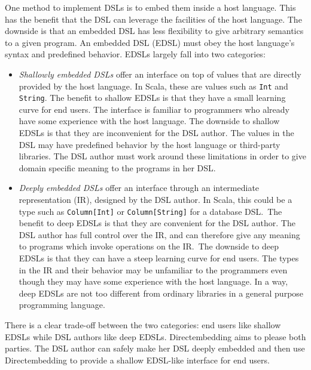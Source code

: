 \documentclass[11pt,a4paper]{article}
\begin{document}
One method to implement DSLs is to embed them inside a host language.
This has the benefit that the DSL can leverage the facilities of the host language.
The downside is that an embedded DSL has less flexibility to give arbitrary semantics to a given program.
An embedded DSL (EDSL) must obey the host language's syntax and predefined behavior.
EDSLs largely fall into two categories:
\begin{itemize}
    \item \emph{Shallowly embedded DSLs} offer an interface on top of values that are directly provided by the host language.
        In Scala, these are values such as \texttt{Int} and \texttt{String}.
        The benefit to shallow EDSLs is that they have a small learning curve for end users.
        The interface is familiar to programmers who already have some experience with the host language.
        The downside to shallow EDSLs is that they are inconvenient for the DSL author.
        The values in the DSL may have predefined behavior by the host language or third-party libraries.
        The DSL author must work around these limitations in order to give domain specific meaning to the programs in her DSL.

    \item \emph{Deeply embedded DSLs} offer an interface through an intermediate representation (IR), designed by the DSL author.
        In Scala, this could be a type such as \texttt{Column[Int]} or \texttt{Column[String]} for a database DSL.\
        The benefit to deep EDSLs is that they are convenient for the DSL author.
        The DSL author has full control over the IR, and can therefore give any meaning to programs which invoke operations on the IR.\
        The downside to deep EDSLs is that they can have a steep learning curve for end users.
        The types in the IR and their behavior may be unfamiliar to the programmers even though they may have some experience with the host language.
        In a way, deep EDSLs are not too different from ordinary libraries in a general purpose programming language.
\end{itemize}
There is a clear trade-off between the two categories: end users like shallow EDSLs while DSL authors like deep EDSLs.
Directembedding aims to please both parties.
The DSL author can safely make her DSL deeply embedded and then use Directembedding to provide a shallow EDSL-like interface for end users.
\end{document}
